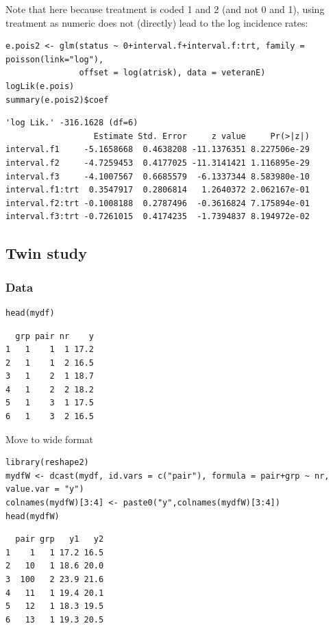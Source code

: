 \documentclass{article}
\begin{document}
Note that here because treatment is coded 1 and 2 (and not 0 and 1),
using treatment as numeric does not (directly) lead to the log incidence rates:
\lstset{language=r,label= ,caption= ,captionpos=b,numbers=none}
\begin{lstlisting}
e.pois2 <- glm(status ~ 0+interval.f+interval.f:trt, family = poisson(link="log"),
               offset = log(atrisk), data = veteranE)
logLik(e.pois)
summary(e.pois2)$coef
\end{lstlisting}

\begin{verbatim}
'log Lik.' -316.1628 (df=6)
                  Estimate Std. Error     z value     Pr(>|z|)
interval.f1     -5.1658668  0.4638208 -11.1376351 8.227506e-29
interval.f2     -4.7259453  0.4177025 -11.3141421 1.116895e-29
interval.f3     -4.1007567  0.6685579  -6.1337344 8.583980e-10
interval.f1:trt  0.3547917  0.2806814   1.2640372 2.062167e-01
interval.f2:trt -0.1008188  0.2787496  -0.3616824 7.175894e-01
interval.f3:trt -0.7261015  0.4174235  -1.7394837 8.194972e-02
\end{verbatim}

\subsection{Twin study}
\label{sec:org87fb87b}
\subsubsection{Data}
\label{sec:orgb8b0f2c}

\lstset{language=r,label= ,caption= ,captionpos=b,numbers=none}
\begin{lstlisting}
head(mydf)
\end{lstlisting}
\begin{verbatim}
  grp pair nr    y
1   1    1  1 17.2
2   1    1  2 16.5
3   1    2  1 18.7
4   1    2  2 18.2
5   1    3  1 17.5
6   1    3  2 16.5
\end{verbatim}


Move to wide format
\lstset{language=r,label= ,caption= ,captionpos=b,numbers=none}
\begin{lstlisting}
library(reshape2)
mydfW <- dcast(mydf, id.vars = c("pair"), formula = pair+grp ~ nr, value.var = "y")
colnames(mydfW)[3:4] <- paste0("y",colnames(mydfW)[3:4])
head(mydfW)
\end{lstlisting}

\begin{verbatim}
  pair grp   y1   y2
1    1   1 17.2 16.5
2   10   1 18.6 20.0
3  100   2 23.9 21.6
4   11   1 19.4 20.1
5   12   1 18.3 19.5
6   13   1 19.3 20.5
\end{verbatim}
\end{document}
